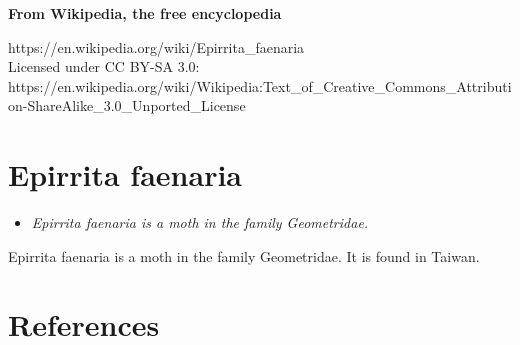 \textbf{From Wikipedia, the free encyclopedia}

https://en.wikipedia.org/wiki/Epirrita\_faenaria\\
Licensed under CC BY-SA 3.0:\\
https://en.wikipedia.org/wiki/Wikipedia:Text\_of\_Creative\_Commons\_Attribution-ShareAlike\_3.0\_Unported\_License

\section{Epirrita faenaria}\label{epirrita-faenaria}

\begin{itemize}
\item
  \emph{Epirrita faenaria is a moth in the family Geometridae.}
\end{itemize}

Epirrita faenaria is a moth in the family Geometridae. It is found in
Taiwan.

\section{References}\label{references}
